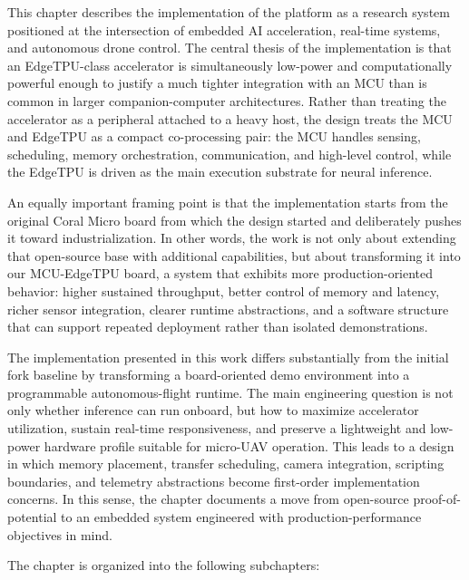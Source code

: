 This chapter describes the implementation of the platform as a research
system positioned at the intersection of embedded AI acceleration,
real-time systems, and autonomous drone control. The central thesis of
the implementation is that an EdgeTPU-class accelerator is
simultaneously low-power and computationally powerful enough to justify
a much tighter integration with an MCU than is common in larger
companion-computer architectures. Rather than treating the accelerator
as a peripheral attached to a heavy host, the design treats the MCU and
EdgeTPU as a compact co-processing pair: the MCU handles sensing,
scheduling, memory orchestration, communication, and high-level control,
while the EdgeTPU is driven as the main execution substrate for neural
inference.

An equally important framing point is that the implementation starts
from the original Coral Micro board from which the design started and
deliberately pushes it toward industrialization. In other words, the
work is not only about extending that open-source base with additional
capabilities, but about transforming it into our MCU-EdgeTPU board, a
system that exhibits more production-oriented behavior: higher sustained
throughput, better control of memory and latency, richer sensor
integration, clearer runtime abstractions, and a software structure that
can support repeated deployment rather than isolated demonstrations.

The implementation presented in this work differs substantially from the
initial fork baseline by transforming a board-oriented demo environment
into a programmable autonomous-flight runtime. The main engineering
question is not only whether inference can run onboard, but how to
maximize accelerator utilization, sustain real-time responsiveness, and
preserve a lightweight and low-power hardware profile suitable for
micro-UAV operation. This leads to a design in which memory placement,
transfer scheduling, camera integration, scripting boundaries, and
telemetry abstractions become first-order implementation concerns. In
this sense, the chapter documents a move from open-source
proof-of-potential to an embedded system engineered with
production-performance objectives in mind.

The chapter is organized into the following subchapters:

